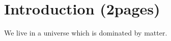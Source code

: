 
\chapter{Introduction (2pages)}
\label{sec:Introduction}

We live in a universe which is dominated by matter.
